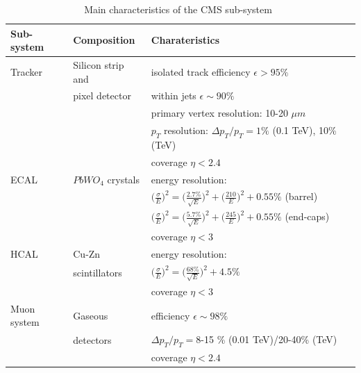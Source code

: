 \begin{table}
\centering
\begin{tabular}[!htbp]{l l l}
\hline
{\textbf{Sub-system}} & {\textbf{Composition}} & {\textbf{Charateristics}} \\
\hline
Tracker  & Silicon strip and  & isolated track efficiency $\epsilon > 95\%$ \\
	& pixel detector	& within jets $\epsilon \sim 90\%$ \\
	& 	& primary vertex resolution: 10-20 $\mu m$ \\
	& 	& $p_T$ resolution: $\Delta p_T/p_T = 1\%$ (0.1 TeV), 10\% (TeV)\\
	& 	& coverage $\eta<2.4$ \\
\hline
ECAL 	& 	$PbWO_4$ crystals 	& energy resolution:\\
		& 	& $\big(\frac{\sigma}{E}\big)^2 = \big(\frac{2.7\%}{\sqrt{E}}\big)^2 + \big(\frac{210}{E}\big)^2 + 0.55\% $  (barrel)\\
		& 	& $\big(\frac{\sigma}{E}\big)^2 = \big(\frac{5.7\%}{\sqrt{E}}\big)^2 + \big(\frac{245}{E}\big)^2 + 0.55\% $  (end-caps)\\
		& 	& coverage $\eta < 3$ \\
\hline
HCAL 	& 	Cu-Zn 	& energy resolution:\\
		& 	scintillators & $\big(\frac{\sigma}{E}\big)^2 = \big(\frac{68\%}{\sqrt{E}}\big)^2 + 4.5\%$ \\
		& 	& coverage $\eta < 3$ \\
\hline
Muon system & Gaseous & efficiency $\epsilon \sim 98\%$ \\
			& detectors & $\Delta p_T/p_T =$8-15 \% (0.01 TeV)/20-40\% (TeV)\\
		& 	& coverage $\eta < 2.4$ \\
\hline
\end{tabular}
\caption{Main characteristics of the CMS sub-system~\cite{JeremieThesis}}
\label{table:CMSMainChar}
\end{table}


